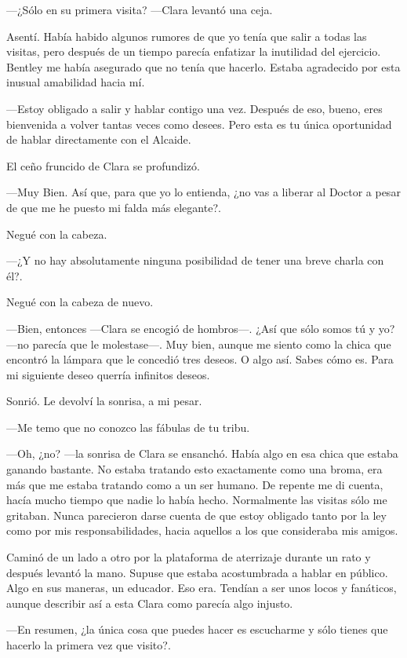 ---¿Sólo en su primera visita? ---Clara levantó una ceja.

Asentí. Había habido algunos rumores de que yo tenía que salir a todas
las visitas, pero después de un tiempo parecía enfatizar la inutilidad
del ejercicio. Bentley me había asegurado que no tenía que hacerlo.
Estaba agradecido por esta inusual amabilidad hacia mí.

---Estoy obligado a salir y hablar contigo una vez. Después de eso,
bueno, eres bienvenida a volver tantas veces como desees. Pero esta es
tu única oportunidad de hablar directamente con el Alcaide.

El ceño fruncido de Clara se profundizó.

---Muy Bien. Así que, para que yo lo entienda, ¿no vas a liberar al
Doctor a pesar de que me he puesto mi falda más elegante?.

Negué con la cabeza.

---¿Y no hay absolutamente ninguna posibilidad de tener una breve charla
con él?.

Negué con la cabeza de nuevo.

---Bien, entonces ---Clara se encogió de hombros---. ¿Así que sólo somos
tú y yo? ---no parecía que le molestase---. Muy bien, aunque me siento
como la chica que encontró la lámpara que le concedió tres deseos. O
algo así. Sabes cómo es. Para mi siguiente deseo querría infinitos
deseos.

Sonrió. Le devolví la sonrisa, a mi pesar.

---Me temo que no conozco las fábulas de tu tribu.

---Oh, ¿no? ---la sonrisa de Clara se ensanchó. Había algo en esa chica
que estaba ganando bastante. No estaba tratando esto exactamente como
una broma, era más que me estaba tratando como a un ser humano. De
repente me di cuenta, hacía mucho tiempo que nadie lo había hecho.
Normalmente las visitas sólo me gritaban. Nunca parecieron darse cuenta
de que estoy obligado tanto por la ley como por mis responsabilidades,
hacia aquellos a los que consideraba mis amigos.

Caminó de un lado a otro por la plataforma de aterrizaje durante un rato
y después levantó la mano. Supuse que estaba acostumbrada a hablar en
público. Algo en sus maneras, un educador. Eso era. Tendían a ser unos
locos y fanáticos, aunque describir así a esta Clara como parecía algo
injusto.

---En resumen, ¿la única cosa que puedes hacer es escucharme y sólo
tienes que hacerlo la primera vez que visito?.

